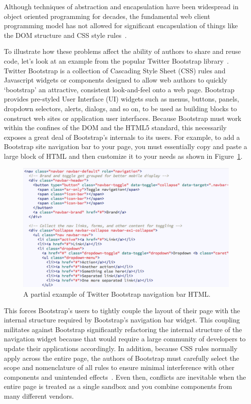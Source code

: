 Although techniques of abstraction and encapsulation have been widespread in object oriented programming for decades,
the fundamental web client programming model has not allowed for significant encapsulation of things like the DOM structure and CSS style rules~\cite{ihrig2012}.

To illustrate how these problems affect the ability of authors to share and reuse code, let's look at an example from the popular Twitter Bootstrap library~\cite{bootstrapcontributors2015}.
Twitter Bootstrap is a collection of Cascading Style Sheet (CSS) rules and Javascript widgets or components designed to allow web authors to quickly `bootstrap' an attractive, consistent look-and-feel onto a web page.
Bootstrap provides pre-styled User Interface (UI) widgets such as menus, buttons, panels, dropdown selectors, alerts, dialogs, and so on, to be used as building blocks to construct web sites or application user interfaces.
Because Bootstrap must work within the confines of the DOM and the HTML5 standard, this necessarily exposes a great deal of Bootstrap's internals to its users.
For example, to add a Bootstrap site navigation bar to your page, you must essentially copy and paste a large block of HTML and then customize it to your needs as shown in Figure~\ref{f:twbs1}.

% 
\begin{figure}[htb]
\centering
 \includegraphics[width=6in]{images/bootstrap_navbar_html.png}
\caption{A partial example of Twitter Bootstrap navigation bar HTML.}
\label{f:twbs1}
\end{figure}
%

This forces Bootstrap's users to tightly couple the layout of their page with the internal structure required by Bootstrap's navigation bar widget. 
This coupling militates against Bootstrap significantly refactoring the internal structure of the navigation widget because that would require a large community of developers to update their applications accordingly.
In addition, because CSS rules normally apply across the entire page, the authors of Bootstrap must carefully select the scope and nomenclature of all rules to ensure minimal interference with other components and unintended effects~\cite{walton2014}. 
Even then, conflicts are inevitable when the entire page is treated as a single sandbox and you combine components from many different vendors. 

